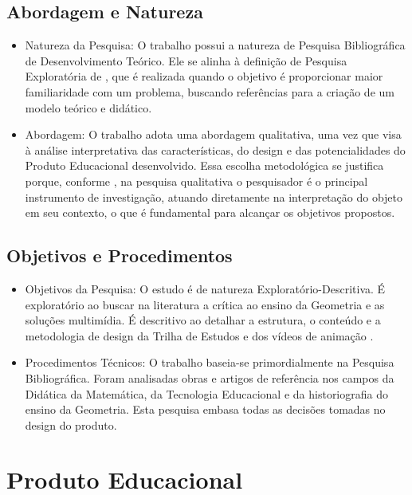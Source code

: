 \subsection{Abordagem e Natureza}
\begin{itemize}
    \item Natureza da Pesquisa: O trabalho possui a natureza de Pesquisa Bibliográfica de Desenvolvimento Teórico. Ele se alinha à definição de Pesquisa Exploratória de , que é realizada quando o objetivo é proporcionar maior familiaridade com um problema, buscando referências para a criação de um modelo teórico e didático.
    \item Abordagem: O trabalho adota uma abordagem qualitativa, uma vez que visa à análise interpretativa das características, do design e das potencialidades do Produto Educacional desenvolvido. Essa escolha metodológica se justifica porque, conforme , na pesquisa qualitativa o pesquisador é o principal instrumento de investigação, atuando diretamente na interpretação do objeto em seu contexto, o que é fundamental para alcançar os objetivos propostos.
\end{itemize}

\subsection{Objetivos e Procedimentos}
\begin{itemize}
    \item Objetivos da Pesquisa: O estudo é de natureza Exploratório-Descritiva. É exploratório ao buscar na literatura a crítica ao ensino da Geometria e as soluções multimídia. É descritivo ao detalhar a estrutura, o conteúdo e a metodologia de design da Trilha de Estudos e dos vídeos de animação \cite{gerhardt2009metodos}.
    \item Procedimentos Técnicos: O trabalho baseia-se primordialmente na Pesquisa Bibliográfica. Foram analisadas obras e artigos de referência nos campos da Didática da Matemática, da Tecnologia Educacional e da historiografia do ensino da Geometria. Esta pesquisa embasa todas as decisões tomadas no design do produto.
\end{itemize}


\section{Produto Educacional}

